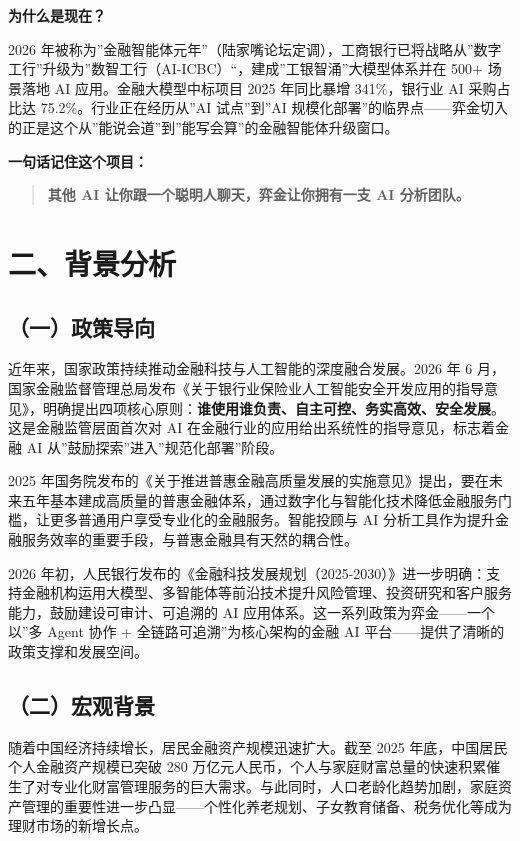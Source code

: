 \documentclass[
]{ctexart}
\begin{document}
\textbf{为什么是现在？}

2026
年被称为''金融智能体元年''（陆家嘴论坛定调），工商银行已将战略从''数字工行''升级为''数智工行（AI-ICBC）``，建成''工银智涌''大模型体系并在
500+ 场景落地 AI 应用。金融大模型中标项目 2025 年同比暴增 341\%，银行业
AI 采购占比达 75.2\%。行业正在经历从''AI 试点''到''AI
规模化部署''的临界点------弈金切入的正是这个从''能说会道''到''能写会算''的金融智能体升级窗口。

\textbf{一句话记住这个项目：}

\begin{quote}
\textbf{其他 AI 让你跟一个聪明人聊天，弈金让你拥有一支 AI 分析团队。}
\end{quote}

\section{二、背景分析}\label{ux4e8cux80ccux666fux5206ux6790}

\subsection{（一）政策导向}\label{ux4e00ux653fux7b56ux5bfcux5411}

近年来，国家政策持续推动金融科技与人工智能的深度融合发展。2026 年 6
月，国家金融监督管理总局发布《关于银行业保险业人工智能安全开发应用的指导意见》，明确提出四项核心原则：\textbf{谁使用谁负责、自主可控、务实高效、安全发展}。这是金融监管层面首次对
AI 在金融行业的应用给出系统性的指导意见，标志着金融 AI
从''鼓励探索''进入''规范化部署''阶段。

2025
年国务院发布的《关于推进普惠金融高质量发展的实施意见》提出，要在未来五年基本建成高质量的普惠金融体系，通过数字化与智能化技术降低金融服务门槛，让更多普通用户享受专业化的金融服务。智能投顾与
AI 分析工具作为提升金融服务效率的重要手段，与普惠金融具有天然的耦合性。

2026
年初，人民银行发布的《金融科技发展规划（2025-2030）》进一步明确：支持金融机构运用大模型、多智能体等前沿技术提升风险管理、投资研究和客户服务能力，鼓励建设可审计、可追溯的
AI 应用体系。这一系列政策为弈金------一个以''多 Agent 协作 +
全链路可追溯''为核心架构的金融 AI
平台------提供了清晰的政策支撑和发展空间。

\subsection{（二）宏观背景}\label{ux4e8cux5b8fux89c2ux80ccux666f}

随着中国经济持续增长，居民金融资产规模迅速扩大。截至 2025
年底，中国居民个人金融资产规模已突破 280
万亿元人民币，个人与家庭财富总量的快速积累催生了对专业化财富管理服务的巨大需求。与此同时，人口老龄化趋势加剧，家庭资产管理的重要性进一步凸显------个性化养老规划、子女教育储备、税务优化等成为理财市场的新增长点。
\end{document}
